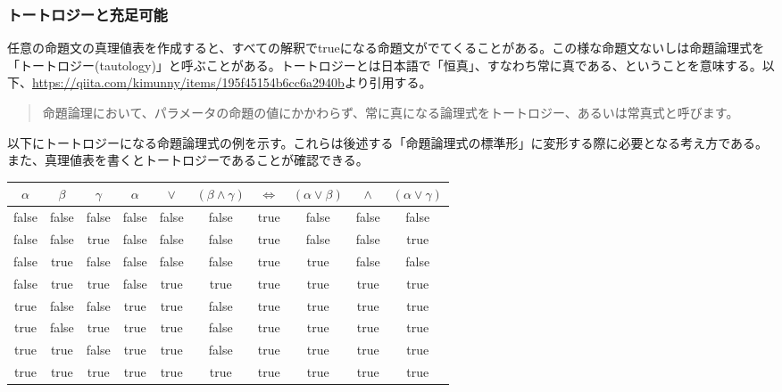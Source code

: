 \documentclass[dvipdfmx]{jsarticle}
\begin{document}
\subsubsection{トートロジーと充足可能}
任意の命題文の真理値表を作成すると、すべての解釈でtrueになる命題文がでてくることがある。この様な命題文ないしは命題論理式を「トートロジー(tautology)」と呼ぶことがある。トートロジーとは日本語で「恒真」、すなわち常に真である、ということを意味する。以下、\url{https://qiita.com/kimunny/items/195f45154b6cc6a2940b}より引用する。
\begin{quote}
  命題論理において、パラメータの命題の値にかかわらず、常に真になる論理式をトートロジー、あるいは常真式と呼びます。
\end{quote}
以下にトートロジーになる命題論理式の例を示す。これらは後述する「命題論理式の標準形」に変形する際に必要となる考え方である。
また、真理値表を書くとトートロジーであることが確認できる。
\begin{table}[H]
  \centering
\begin{tabular}{|c|c|c||c|c|c|c|c|c|c|} \hline
$\alpha$ & $\beta$ & $\gamma$ & $\alpha$ & $\vee$ & $(\beta \wedge \gamma)$ & $\Leftrightarrow$ & $(\alpha \vee \beta)$ & $\wedge$ & $(\alpha \vee \gamma)$ \\ \hline
false    & false   & false    & false    & false  & false                   & true              & false                 & false    & false                  \\ \hline
false    & false   & true     & false    & false  & false                   & true              & false                 & false    & true                   \\ \hline
false    & true    & false    & false    & false  & false                   & true              & true                  & false    & false                  \\ \hline
false    & true    & true     & false    & true   & true                    & true              & true                  & true     & true                   \\ \hline
true     & false   & false    & true     & true   & false                   & true              & true                  & true     & true                   \\ \hline
true     & false   & true     & true     & true   & false                   & true              & true                  & true     & true                   \\ \hline
true     & true    & false    & true     & true   & false                   & true              & true                  & true     & true                   \\ \hline
true     & true    & true     & true     & true   & true                    & true              & true                  & true     & true \\ \hline
\end{tabular}
\end{table}
\end{document}
